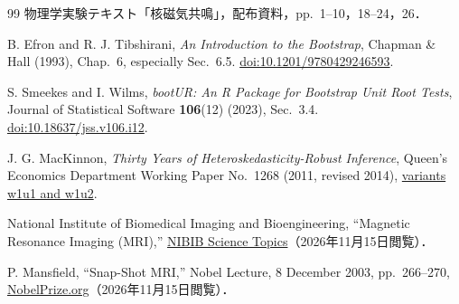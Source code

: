 \documentclass[dvipdfmx,a4paper,11pt]{jsarticle}
\begin{document}
\begin{thebibliography}{99}
  物理学実験テキスト「核磁気共鳴」，配布資料，pp.~1--10，18--24，26．

  B. Efron and R. J. Tibshirani, \textit{An Introduction to the Bootstrap},
  Chapman \& Hall (1993), Chap.~6, especially Sec.~6.5.
  \href{https://doi.org/10.1201/9780429246593}{doi:10.1201/9780429246593}.

  S. Smeekes and I. Wilms, \textit{bootUR: An R Package for Bootstrap Unit Root Tests},
  Journal of Statistical Software \textbf{106}(12) (2023), Sec.~3.4.
  \href{https://doi.org/10.18637/jss.v106.i12}{doi:10.18637/jss.v106.i12}.

  J. G. MacKinnon, \textit{Thirty Years of Heteroskedasticity-Robust Inference},
  Queen's Economics Department Working Paper No.~1268 (2011, revised 2014),
  \href{https://qed.econ.queensu.ca/working_papers/papers/qed_wp_1268.pdf}{variants w1u1 and w1u2}.

  National Institute of Biomedical Imaging and Bioengineering, ``Magnetic Resonance Imaging (MRI),''
  \href{https://www.nibib.nih.gov/science-education/science-topics/magnetic-resonance-imaging-mri}{NIBIB Science Topics}（2026年11月15日閲覧）．

  P. Mansfield, ``Snap-Shot MRI,'' Nobel Lecture, 8 December 2003, pp.~266--270,
  \href{https://www.nobelprize.org/uploads/2018/06/mansfield-lecture.pdf}{NobelPrize.org}（2026年11月15日閲覧）．
\end{thebibliography}
\end{document}

